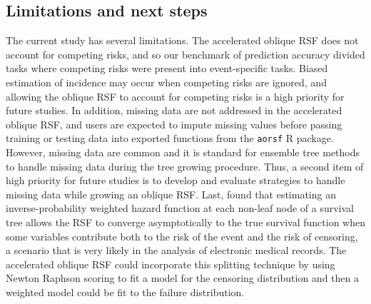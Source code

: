 \documentclass[twoside,11pt]{article}\usepackage[]{graphicx}\usepackage[]{xcolor}
\begin{document}
\subsection{Limitations and next steps}

The current study has several limitations. The accelerated oblique RSF does not account for competing risks, and so our benchmark of prediction accuracy divided tasks where competing risks were present into event-specific tasks. Biased estimation of incidence may occur when competing risks are ignored, and allowing the oblique RSF to account for competing risks is a high priority for future studies. In addition, missing data are not addressed in the accelerated oblique RSF, and users are expected to impute missing values before passing training or testing data into exported functions from the \texttt{aorsf} R package. However, missing data are common and it is standard for ensemble tree methods to handle missing data during the tree growing procedure. Thus, a second item of high priority for future studies is to develop and evaluate strategies to handle missing data while growing an oblique RSF. Last, \citet{cui2017consistency} found that estimating an inverse-probability weighted hazard function at each non-leaf node of a survival tree allows the RSF to converge asymptotically to the true survival function when some variables contribute both to the risk of the event and the risk of censoring, a scenario that is very likely in the analysis of electronic medical records. The accelerated oblique RSF could incorporate this splitting technique by using Newton Raphson scoring to fit a model for the censoring distribution and then a weighted model could be fit to the failure distribution.




\newpage

\appendix
\end{document}
